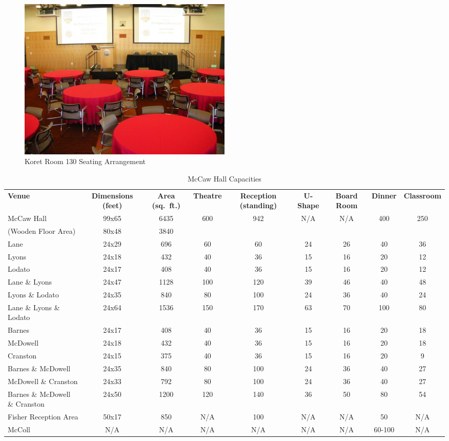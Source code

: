 \documentclass[11pt]{article}
\begin{document}
\begin{figure}
  \centering
  \includegraphics[width=0.5\textwidth]{fig/ktseat}
  \caption{Koret Room 130 Seating Arrangement}
  \label{fig:koret-seat}
\end{figure}

\begin{table}
  \centering
  \tiny
  \begin{tabular}{lcccccccc}
    \textbf{Venue}
    &\textbf{Dimensions (feet)}
    &\textbf{Area (sq.~ft.)}
    &\textbf{Theatre}
    &\textbf{Reception (standing)}
    &\textbf{U-Shape}
    &\textbf{Board Room}
    &\textbf{Dinner}
    &\textbf{Classroom}\\
    McCaw Hall & 99x65 &6435 &600 &942 &N/A &N/A &400 &250\\
    (Wooden Floor Area) &80x48 &3840 \\
    Lane &24x29 &696 &60 &60 &24 &26 &40 &36\\
    Lyons &24x18 &432 &40 &36 &15 &16 &20 &12\\
    Lodato &24x17 &408 &40 &36 &15 &16 &20 &12\\
    Lane \& Lyons &24x47 &1128 &100 &120 &39 &46 &40 &48\\
    Lyons \& Lodato &24x35 &840 &80 &100 &24 &36 &40 &24\\
    Lane \& Lyons \& Lodato &24x64 &1536 &150 &170 &63 &70 &100 &80\\
    Barnes &24x17 &408 &40 &36 &15 &16 &20 &18\\
    McDowell &24x18 &432 &40 &36 &15 &16 &20 &18\\
    Cranston &24x15 &375 &40 &36 &15 &16 &20 &9\\
    Barnes \& McDowell &24x35 &840 &80 &100 &24 &36 &40 &27\\
    McDowell \& Cranston &24x33 &792 &80 &100 &24 &36 &40 &27\\
    Barnes \& McDowell \& Cranston &24x50 &1200 &120 &140 &36 &50 &80
    &54\\
    Fisher Reception Area &50x17 &850 &N/A &100 &N/A &N/A &50 &N/A\\
    McColl &N/A &N/A &N/A &N/A &N/A &N/A &60-100 &N/A\\
  \end{tabular}
  \caption{McCaw Hall Capacities}
  \label{tab:mc-capacity}
\end{table}
\end{document}
